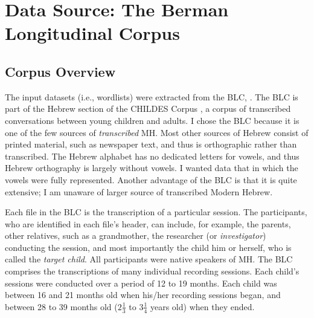 \section{Data Source: The Berman Longitudinal Corpus}

\subsection{Corpus Overview}
The input datasets (i.e., wordlists) were extracted 
from the \ac{BLC}, \citep{berman-weissenborn:1991}. 
The \ac{BLC} is part of the Hebrew section of the 
CHILDES Corpus \citep{macwhinney:2000a}, a corpus 
of transcribed conversations between young children 
and adults. I chose the \ac{BLC} because 
it is one of the few sources of \emph{transcribed} \ac{MH}. 
Most other sources of Hebrew consist of printed material, 
such as newspaper text, and thus is orthographic 
rather than transcribed. The Hebrew alphabet has no 
dedicated letters for vowels, and thus Hebrew 
orthography is largely without vowels. I wanted data 
that in which the vowels were 
fully represented. Another advantage of the \ac{BLC} is that 
it is quite extensive; I am unaware of larger source of 
transcribed Modern Hebrew. 

Each file in the \ac{BLC} is the transcription of a particular session. 
The participants, who are identified in each file's
header, can include, for example, the parents,
 other relatives, such as a grandmother, 
the researcher (or \emph{investigator}) conducting the 
session, and most importantly the child him or herself, 
who is called the \emph{target child}. All participants 
were native speakers of \ac{MH}. The \ac{BLC} comprises 
the transcriptions of many individual recording sessions. 
Each child's sessions were conducted over a period of 
12 to 19 months. Each child was between 16 and 21 months 
old when his/her recording sessions began, and between 
28 to 39 months old ($2\frac{1}{3}$ to $3\frac{1}{4}$ 
years old) when they ended.


